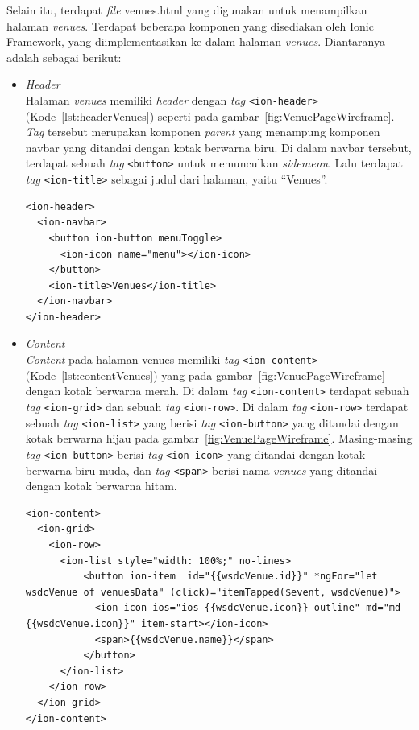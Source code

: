 \begin{enumerate}
	Selain itu, terdapat \textit{file} venues.html yang digunakan untuk menampilkan halaman \textit{venues}. Terdapat beberapa komponen yang disediakan oleh Ionic Framework, yang diimplementasikan ke dalam halaman \textit{venues}. Diantaranya adalah sebagai berikut:	
	
	\begin{itemize}
		\item \textit{Header} \\
		Halaman \textit{venues} memiliki \textit{header} dengan \textit{tag} \texttt{<ion-header>} (Kode~\ref{lst:headerVenues}) seperti pada gambar~\ref{fig:VenuePageWireframe}. \textit{Tag} tersebut merupakan komponen \textit{parent} yang menampung komponen navbar yang ditandai dengan kotak berwarna biru. Di dalam navbar tersebut, terdapat sebuah \textit{tag} \texttt{<button>} untuk memunculkan \textit{sidemenu}. Lalu terdapat \textit{tag} \texttt{<ion-title>} sebagai judul dari halaman, yaitu ``Venues''.
		
\begin{lstlisting}[label={lst:headerVenues}, caption=\textit{Header} pada venues.html]
<ion-header>
  <ion-navbar>
    <button ion-button menuToggle>
      <ion-icon name="menu"></ion-icon>
    </button>
    <ion-title>Venues</ion-title>
  </ion-navbar>
</ion-header>
\end{lstlisting}

		\item \textit{Content} \\
		\textit{Content} pada halaman venues memiliki \textit{tag} \texttt{<ion-content>} (Kode~\ref{lst:contentVenues}) yang pada gambar~\ref{fig:VenuePageWireframe} dengan kotak berwarna merah. Di dalam \textit{tag} \texttt{<ion-content>} terdapat sebuah \textit{tag} \texttt{<ion-grid>} dan sebuah \textit{tag} \texttt{<ion-row>}. Di dalam \textit{tag} \texttt{<ion-row>} terdapat sebuah \textit{tag} \texttt{<ion-list>} yang berisi \textit{tag} \texttt{<ion-button>} yang ditandai dengan kotak berwarna hijau pada gambar~\ref{fig:VenuePageWireframe}. Masing-masing \textit{tag} \texttt{<ion-button>} berisi \textit{tag} \texttt{<ion-icon>} yang ditandai dengan kotak berwarna biru muda, dan \textit{tag} \texttt{<span>} berisi nama \textit{venues} yang ditandai dengan kotak berwarna hitam. 
		
\begin{lstlisting}[label={lst:contentVenues}, caption=\textit{Content} pada venues.html]
<ion-content>
  <ion-grid>
    <ion-row>
      <ion-list style="width: 100%;" no-lines>
          <button ion-item  id="{{wsdcVenue.id}}" *ngFor="let wsdcVenue of venuesData" (click)="itemTapped($event, wsdcVenue)">
            <ion-icon ios="ios-{{wsdcVenue.icon}}-outline" md="md-{{wsdcVenue.icon}}" item-start></ion-icon>
            <span>{{wsdcVenue.name}}</span>
          </button>
      </ion-list>
    </ion-row>
  </ion-grid>
</ion-content>
\end{lstlisting}
	\end{itemize}


\end{enumerate}
